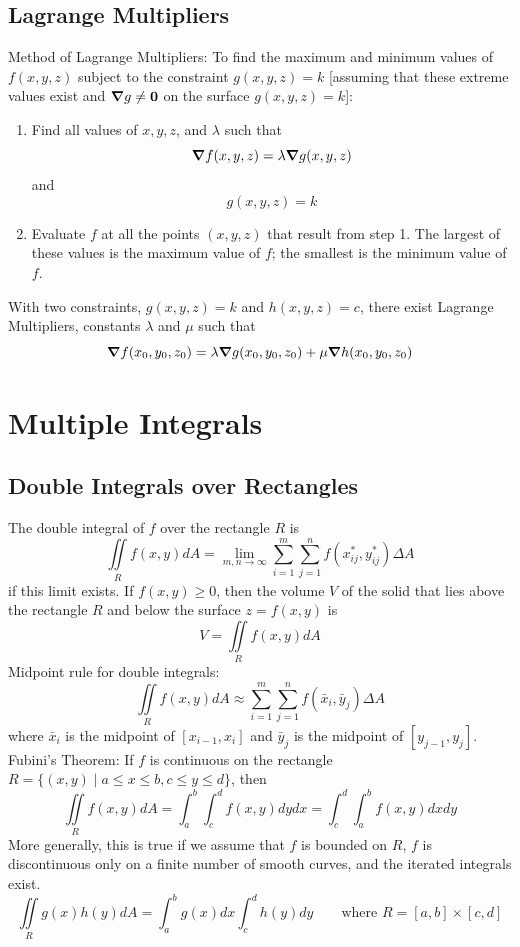 \documentclass{article}
\begin{document}
    \subsection{Lagrange Multipliers}
    \begin{outline}
        \1 Method of Lagrange Multipliers: To find the maximum and minimum values of \(f(x,y,z)\) subject to the constraint \(g(x,y,z)=k\) [assuming that these extreme values exist and \(\grad{g}\neq \vb{0}\) on the surface \(g(x,y,z)=k\)]: 
        \begin{enumerate}
            \item Find all values of \(x,y,z\), and \(\lambda\) such that \[\grad f(x,y,z)=\lambda\grad g(x,y,z)\] and \[g(x,y,z)=k\]
            \item Evaluate $f$ at all the points \((x,y,z)\) that result from step 1. The largest of these values is the maximum value of $f$; the smallest is the minimum value of $f$. 
        \end{enumerate}

    \end{outline}

\begin{outline}
        \1 With two constraints, \(g(x,y,z)=k\) and \(h(x,y,z)=c\), there exist Lagrange Multipliers, constants \(\lambda\) and \(\mu\) such that \[\grad f(x_0,y_0,z_0)=\lambda\grad g(x_0,y_0,z_0)+\mu\grad h(x_0,y_0,z_0)\]
    \end{outline}

    \section{Multiple Integrals} %
    \subsection{Double Integrals over Rectangles} %
    \begin{outline}
        \1 The double integral of $f$ over the rectangle $R$ is \[\iint\limits_Rf(x,y)dA=\lim_{m,n\to\infty}\sum^m_{i=1}\sum^n_{j=1}f(x_{ij}^*,y_{ij}^*)\Delta A\] if this limit exists. 
        \1 If \(f(x,y)\geq 0\), then the volume $V$ of the solid that lies above the rectangle $R$ and below the surface \(z=f(x,y)\) is \[V=\iint\limits_Rf(x,y)dA\]
        \1 Midpoint rule for double integrals: \[\iint\limits_Rf(x,y)dA\approx\sum^m_{i=1}\sum^n_{j=1}f(\bar x_i,\bar y_j)\Delta A\] where \(\bar x_i\) is the midpoint of \([x_{i-1},x_i]\) and \(\bar y_j\) is the midpoint of \([y_{j-1},y_j]\). 
        \1 Fubini's Theorem: If $f$ is continuous on the rectangle \(R=\{(x,y)\;|\;a\leq x\leq b,c\leq y\leq d\}\), then \[\iint\limits_Rf(x,y)dA=\int^b_a\int^d_cf(x,y)dydx=\int^d_c\int^b_af(x,y)dxdy\] More generally, this is true if we assume that $f$ is bounded on $R$, $f$ is discontinuous only on a finite number of smooth curves, and the iterated integrals exist. 
        \1 \[\iint\limits_Rg(x)h(y)dA=\int^b_ag(x)dx\int^d_ch(y)dy\qquad\text{where }R=[a,b]\times[c,d]\]

    \end{outline}
\end{document}
